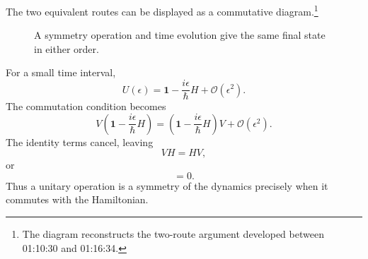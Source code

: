 The two equivalent routes can be displayed as a commutative diagram.\footnote{The diagram reconstructs the two-route argument developed between 01:10:30 and 01:16:34.}
\begin{figure}
\centering
{}
\caption{A symmetry operation and time evolution give the same final state in either order.}
\end{figure}

\begin{classroomqa}
\end{classroomqa}

\begin{classroomqa}
\end{classroomqa}

For a small time interval,
\begin{equation}
U(\epsilon)
=
\mathbf 1-\frac{i\epsilon}{\hbar}H
+\mathcal O(\epsilon^2).
\end{equation}
The commutation condition becomes
\begin{equation}
V\left(
\mathbf 1-\frac{i\epsilon}{\hbar}H
\right)
=
\left(
\mathbf 1-\frac{i\epsilon}{\hbar}H
\right)V
+\mathcal O(\epsilon^2).
\end{equation}
The identity terms cancel, leaving
\begin{equation}
VH=HV,
\end{equation}
or
\begin{equation}
[V,H]=0.
\end{equation}
Thus a unitary operation is a symmetry of the dynamics precisely when it commutes with the Hamiltonian.

